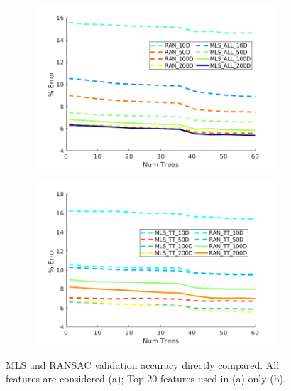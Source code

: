 \documentclass[numbered,pdftex]{ohio-etd}
\begin{document}
{		\begin{figure}[H]
			\centering
			\begin{subfigure}{0.45\textwidth}
				\centering
				\includegraphics[width=1\linewidth]{Defense_Images/MLS_RAN_ALL}
				\caption[]{}
				\label{fig:all_mls_ransac_comp}
			\end{subfigure}
			\begin{subfigure}{0.45\textwidth}
				\centering
				\includegraphics[width=1\linewidth]{Defense_Images/MLS_RAN_TT}
				\caption[]{}
				\label{fig:xyz_mls_ransac_comp}
			\end{subfigure}
			\caption[MLS vs RANSAC Validation Accuracy (1)]{MLS and RANSAC validation accuracy directly compared. All features are considered (a); Top 20 features used in (a) only (b).}
			\label{fig:xyz_mls_comp_1}
		\end{figure}
	
}
\end{document}
